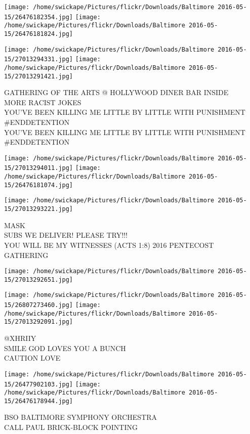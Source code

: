 \documentclass[10pt,letterpaper]{article}
\begin{document}
\texttt{[image: /home/swickape/Pictures/flickr/Downloads/Baltimore 2016-05-15/26476182354.jpg]}
\texttt{[image: /home/swickape/Pictures/flickr/Downloads/Baltimore 2016-05-15/26476181824.jpg]}

\texttt{[image: /home/swickape/Pictures/flickr/Downloads/Baltimore 2016-05-15/27013294331.jpg]}
\texttt{[image: /home/swickape/Pictures/flickr/Downloads/Baltimore 2016-05-15/27013291421.jpg]}

GATHERING OF THE ARTS @ HOLLYWOOD DINER BAR INSIDE\\
MORE RACIST JOKES\\
YOU'VE BEEN KILLING ME LITTLE BY LITTLE WITH PUNISHMENT \#ENDDETENTION\\
YOU'VE BEEN KILLING ME LITTLE BY LITTLE WITH PUNISHMENT \#ENDDETENTION\\
\pagebreak

\texttt{[image: /home/swickape/Pictures/flickr/Downloads/Baltimore 2016-05-15/27013294011.jpg]}
\texttt{[image: /home/swickape/Pictures/flickr/Downloads/Baltimore 2016-05-15/26476181074.jpg]}

\texttt{[image: /home/swickape/Pictures/flickr/Downloads/Baltimore 2016-05-15/27013293221.jpg]}

MASK\\
SUBS WE DELIVER!  PLEASE TRY!!!\\
YOU WILL BE MY WITNESSES (ACTS 1:8) 2016 PENTECOST GATHERING\\
\pagebreak

\texttt{[image: /home/swickape/Pictures/flickr/Downloads/Baltimore 2016-05-15/27013292651.jpg]}

\vspace{0.25in}
\texttt{[image: /home/swickape/Pictures/flickr/Downloads/Baltimore 2016-05-15/26807273460.jpg]}
\texttt{[image: /home/swickape/Pictures/flickr/Downloads/Baltimore 2016-05-15/27013292091.jpg]}

@XHRIIY\\
SMILE GOD LOVES YOU A BUNCH\\
CAUTION LOVE\\
\pagebreak

\texttt{[image: /home/swickape/Pictures/flickr/Downloads/Baltimore 2016-05-15/26477902103.jpg]}
\texttt{[image: /home/swickape/Pictures/flickr/Downloads/Baltimore 2016-05-15/26476178944.jpg]}

BSO BALTIMORE SYMPHONY ORCHESTRA\\
CALL PAUL BRICK{-}BLOCK POINTING\\
\pagebreak
\end{document}
